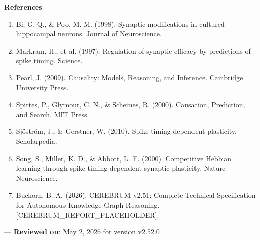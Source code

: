 \textbf{References}
\begin{enumerate}
\item Bi, G. Q., \& Poo, M. M. (1998). Synaptic modif\-ications in cultured hippocampal neurons. Journal of Neuros\-cience.
\item Markram, H., et al. (1997). Regulation of synaptic efficacy by predictions of spike timing. Science.
\item Pearl, J. (2009). Causality: Models, Reasoning, and Inference. Cambridge University Press.
\item Spirtes, P., Glymour, C. N., \& Scheines, R. (2000). Causation, Prediction, and Search. MIT Press.
\item Sjöström, J., \& Gerstner, W. (2010). Spike-timing dependent plasticity. Schola\-rpedia.
\item Song, S., Miller, K. D., \& Abbott, L. F. (2000). Competitive Hebbian learning through spike-timing-dependent synaptic plasticity. Nature Neuros\-cience.
\item Buchorn, B. A. (2026). CEREBRUM v2.51: Complete Technical Specif\-ication for Autonomous Knowledge Graph Reasoning. [CEREBRUM\_REPORT\_PLACEHOLDER].

\end{enumerate}
---
\textbf{Reviewed on}: May 2, 2026 for version v2.52.0
